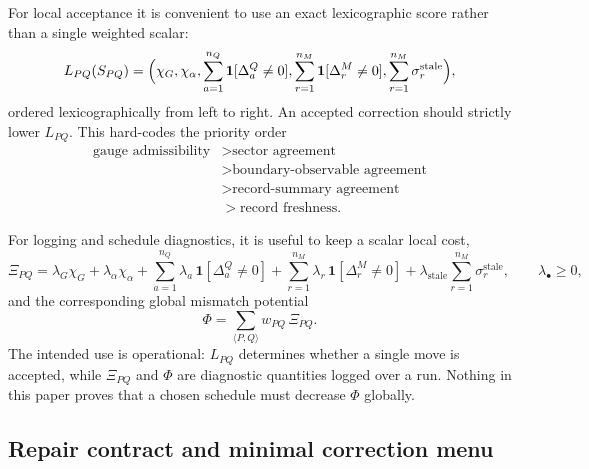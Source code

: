 \documentclass[11pt]{article}
\begin{document}
For local acceptance it is convenient to use an exact lexicographic score rather than a single
weighted scalar:
\begin{equation}
L_{PQ}(S_{PQ})
=
\Bigl(
\chi_G,
\chi_{\alpha},
\sum_{a=1}^{n_Q}\mathbf 1[\Delta_a^{Q}\neq 0],
\sum_{r=1}^{n_M}\mathbf 1[\Delta_r^{M}\neq 0],
\sum_{r=1}^{n_M}\sigma_r^{\mathrm{stale}}
\Bigr),
\end{equation}
ordered lexicographically from left to right. An accepted correction should strictly
lower $L_{PQ}$. This hard-codes the priority order
\begin{equation}
\begin{aligned}
\text{gauge admissibility}
&>\text{sector agreement}\\
&>\text{boundary-observable agreement}\\
&>\text{record-summary agreement}\\
&>\text{record freshness}.
\end{aligned}
\end{equation}

For logging and schedule diagnostics, it is useful to keep a scalar local cost,
\begin{equation}
\Xi_{PQ}
=
\lambda_G\chi_G
+
\lambda_{\alpha}\chi_{\alpha}
+
\sum_{a=1}^{n_Q}\lambda_a\,\mathbf 1[\Delta_a^{Q}\neq 0]
+
\sum_{r=1}^{n_M}\lambda_r\,\mathbf 1[\Delta_r^{M}\neq 0]
+
\lambda_{\mathrm{stale}}\sum_{r=1}^{n_M}\sigma_r^{\mathrm{stale}},
\qquad \lambda_{\bullet}\ge 0,
\end{equation}
and the corresponding global mismatch potential
\begin{equation}
\Phi=\sum_{\langle P,Q\rangle} w_{PQ}\,\Xi_{PQ}.
\end{equation}
The intended use is operational: $L_{PQ}$ determines whether a single move is accepted, while
$\Xi_{PQ}$ and $\Phi$ are diagnostic quantities logged over a run. Nothing in this paper proves
that a chosen schedule must decrease $\Phi$ globally.

\subsection{Repair contract and minimal correction menu}
\end{document}
